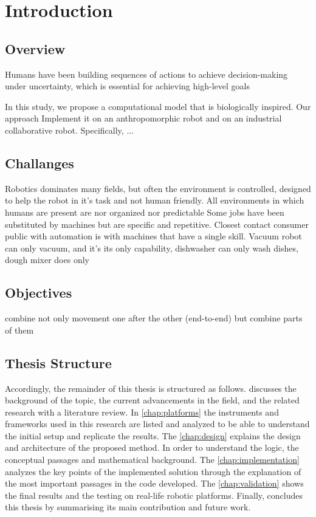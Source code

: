 \chapter{Introduction}
\label{chap:introduction}

\section{Overview}
Humans have been building sequences of actions to achieve 
decision-making under uncertainty, which is essential for achieving high-level goals

In this study, we propose a computational model that is biologically inspired. Our approach 
Implement it on an anthropomorphic robot and on an industrial collaborative robot.
Specifically, ... 

\section{Challanges}
Robotics dominates many fields, but often the environment is controlled, designed to help the robot in it's task and not human friendly. All environments in which humans are present are nor organized nor predictable 
Some jobs have been substituted by machines but are specific and repetitive. Closest contact consumer public with automation is with machines that have a single skill. Vacuum robot can only vacuum, and it's its only capability, dishwasher can only wash dishes, dough mixer does only
\section{Objectives}
 combine not only movement one after the other (end-to-end) but combine parts of them

\section{Thesis Structure} 
Accordingly, the remainder of this thesis is structured as follows.
 discusses the background of the topic, the current advancements in the field, and the related research with a literature review. 
In \cref{chap:platforms} the instruments and frameworks used in this research are listed and analyzed to be able to understand the initial setup and replicate the results. 
The \cref{chap:design} explains the design and architecture of the proposed method. In order to understand the logic, the conceptual passages and mathematical background. 
The \cref{chap:implementation} analyzes the key points of the implemented solution through the explanation of the most important passages in the code developed.
The \cref{chap:validation} shows the final results and the testing on real-life robotic platforms.
Finally,  concludes this thesis by summarising its main contribution and future work.